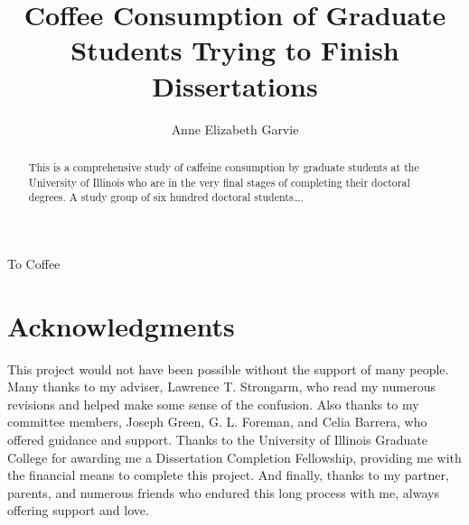 \documentclass[
    11pt,
    edeposit,
    draftthesis]{uiucthesis2020}
\title{Coffee Consumption of Graduate Students Trying to Finish Dissertations}
\author{Anne Elizabeth Garvie}
\begin{document}
\maketitle


\begin{frontmatter}

\begin{abstract}
This is a comprehensive study of caffeine consumption by graduate
students at the University of Illinois who are in the very final
stages of completing their doctoral degrees. A study group of six
hundred doctoral students\ldots.
\end{abstract}

\begin{dedication}
To Coffee
\end{dedication}

\chapter*{Acknowledgments}

This project would not have been possible without the support of
many people. Many thanks to my adviser, Lawrence T. Strongarm, who
read my numerous revisions and helped make some sense of the
confusion. Also thanks to my committee members, Joseph Green,
G. L. Foreman, and Celia Barrera, who offered guidance and support.
Thanks to the University of Illinois Graduate College for awarding
me a Dissertation Completion Fellowship, providing me with the
financial means to complete this project. And finally, thanks to
my partner, parents, and numerous friends who endured this long
process with me, always offering support and love.

\tableofcontents
\listoftables
\listoffigures
{}

\end{frontmatter}


\end{document}
